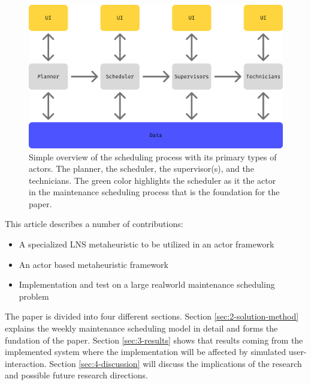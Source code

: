 \begin{figure}
\includegraphics[width=1.0\textwidth]{figures/Scheduling Process Integrated.png}
\caption{Simple overview of the scheduling process with its primary types of actors. The planner, the scheduler, the supervisor(s), and the technicians. 
The green color highlights the scheduler as it the actor in the maintenance scheduling process that is the foundation for the paper.}
\label{fig:simple-maintenance-process}
\end{figure}

This article describes a number of contributions: 

\begin{itemize}
\item A specialized LNS metaheuristic to be utilized in an actor framework
\item An actor based metaheuristic framework
\item Implementation and test on a large realworld maintenance scheduling problem
\end{itemize}

The paper is divided into four different sections. Section \ref{sec:2-solution-method} explains the weekly maintenance scheduling model in detail and forms the fundation of the paper. Section \ref{sec:3-results} shows that results coming from the implemented system where the implementation will be affected by simulated user-interaction. Section \ref{sec:4-discussion} will discuss the implications of the research and possible future research directions.

